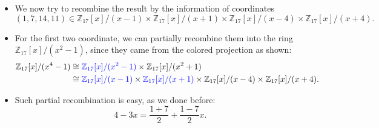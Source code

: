 \begin{frame}
    \begin{itemize}
        \item <1->We now try to recombine the result by the information of coordinates
            \[
            (1, 7, 14, 11)\in 
                \mathbb{Z}_{17}[x]/(x-1) \times 
                \mathbb{Z}_{17}[x]/(x+1) \times 
                \mathbb{Z}_{17}[x]/(x-4) \times 
                \mathbb{Z}_{17}[x]/(x+4).
            \]
        \item <2->For the first two coordinate, we can partially recombine them into the ring 
            \( \mathbb{Z}_{17}[x]/(x^{2}-1) \), since they came from the colored projection as shown:
            \begin{align*}
                \mathbb{Z}_{17}[x]/(x^{4}-1) 
                &\cong 
                {\color{blue}\mathbb{Z}_{17}[x]/(x^{2}-1)}\times 
                \mathbb{Z}_{17}[x]/(x^{2}+1)\\
                &\cong 
                {\color{blue}\mathbb{Z}_{17}[x]/(x-1)} \times 
                {\color{blue}\mathbb{Z}_{17}[x]/(x+1)} \times 
                \mathbb{Z}_{17}[x]/(x-4) \times 
                \mathbb{Z}_{17}[x]/(x+4).
            \end{align*}
        \item <3->Such partial recombination is easy, as we done before:
            \[
                4 - 3x = \frac{1+7}{2} + \frac{1-7}{2}x .
            \]

    \end{itemize}
\end{frame}


